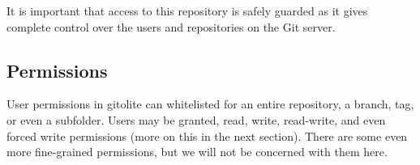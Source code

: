 It is important that access to this repository is safely guarded as it gives
complete control over the users and repositories on the Git server.

\subsection{Permissions}

User permissions in gitolite can whitelisted for an entire repository, a
branch, tag, or even a subfolder. Users may be granted, read, write,
read-write, and even forced write permissions (more on this in the next
section).  There are some even more fine-grained
permissions\cite{gitolite-com-2014e}, but we will not be concerned with them
here.

